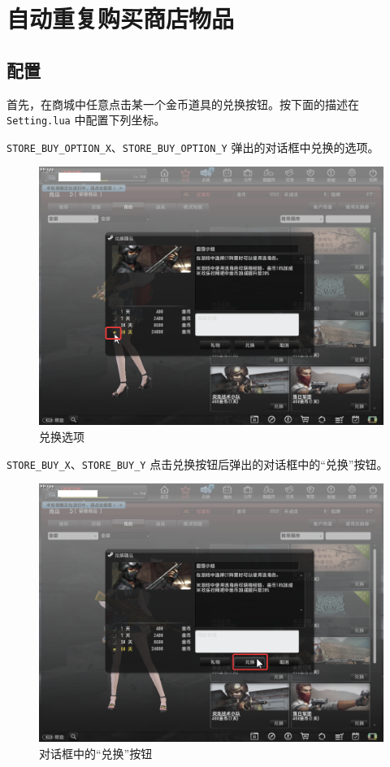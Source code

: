 \section{自动重复购买商店物品}

\subsection{配置}

首先，在商城中任意点击某一个金币道具的兑换按钮。按下面的描述在 \lstinline{Setting.lua} 中配置下列坐标。

\lstinline{STORE_BUY_OPTION_X}、\lstinline{STORE_BUY_OPTION_Y} 弹出的对话框中兑换的选项。

\begin{figure}[H]
    \Centering
    \includegraphics[width=\textwidth]{docs/assets/store_buy_option.png}
    \caption{兑换选项}
\end{figure}

\lstinline{STORE_BUY_X}、\lstinline{STORE_BUY_Y} 点击兑换按钮后弹出的对话框中的“兑换”按钮。

\begin{figure}[H]
    \Centering
    \includegraphics[width=\textwidth]{docs/assets/store_purchase.png}
    \caption{对话框中的“兑换”按钮}
\end{figure}

